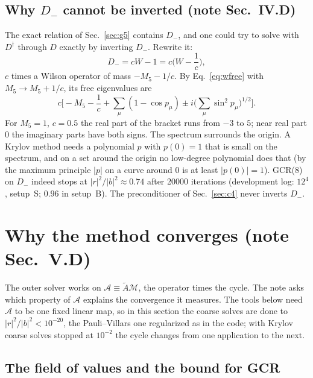 \documentclass[11pt,a4paper]{article}
\numberwithin{equation}{section}
\newcommand{\dg}{^{\dagger}}
\begin{document}
\subsection{Why $D_-$ cannot be inverted (note Sec.~IV.D)}
\label{sec:dminus}
The exact relation of Sec.~\ref{sec:g5} contains $D_-$, and one could try to solve with $D\dg$
through $D$ exactly by inverting $D_-$. Rewrite it:
\begin{equation}
D_-=cW-1=c\Big(W-\frac1c\Big),
\end{equation}
$c$ times a Wilson operator of mass $-M_5-1/c$. By Eq.~\eqref{eq:wfree} with $M_5\to M_5+1/c$, its
free eigenvalues are
\begin{equation}
c\Big[-M_5-\frac1c+\sum_\mu(1-\cos p_\mu)\pm i\Big(\sum_\mu\sin^2p_\mu\Big)^{1/2}\Big].
\end{equation}
For $M_5=1$, $c=0.5$ the real part of the bracket runs from $-3$ to $5$; near real part $0$ the
imaginary parts have both signs. The spectrum surrounds the origin. A Krylov method needs a
polynomial $p$ with $p(0)=1$ that is small on the spectrum, and on a set around the origin no
low-degree polynomial does that (by the maximum principle $|p|$ on a curve around $0$ is at least
$|p(0)|=1$). GCR(8) on $D_-$ indeed stops at $|r|^2/|b|^2\approx0.74$ after 20000 iterations (development
log: $12^4$, setup~S; $0.96$ in setup~B).
The preconditioner of Sec.~\ref{sec:c4} never inverts $D_-$.

\section{Why the method converges (note Sec.~V.D)}
\label{sec:why}
The outer solver works on $\mathcal A\equiv\tilde A\mathcal M$, the operator times the cycle. The
note asks which property of $\mathcal A$ explains the convergence it measures. The tools below
need $\mathcal A$ to be one fixed linear map, so in this section the coarse solves are done to
$|r|^2/|b|^2<10^{-20}$, the Pauli--Villars one regularized as in the code; with
Krylov coarse solves stopped at $10^{-2}$ the cycle changes from one application to the next.

\subsection{The field of values and the bound for GCR}
\end{document}
